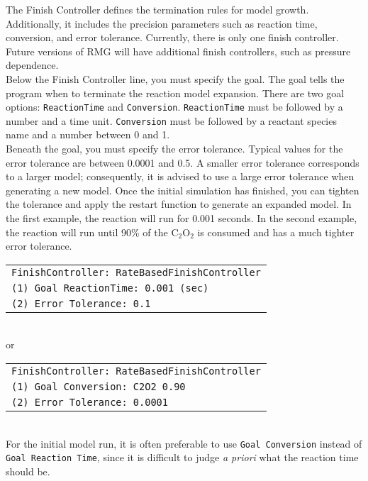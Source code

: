\documentclass[12pt,letterpaper]{article}
\begin{document}
The Finish Controller defines the termination rules for model growth. Additionally,
it includes the precision parameters such as reaction time, conversion,
and error tolerance. Currently, there is only one finish controller. Future
versions of RMG will have additional finish controllers, such as pressure dependence.\\

Below the Finish Controller line, you must specify the goal. The goal tells
the program when to terminate the reaction model expansion. There are two
goal options: \texttt{ReactionTime} and \texttt{Conversion}. \texttt{ReactionTime} must be followed
by a number and a time unit. \texttt{Conversion} must be followed by a reactant
species name and a number between 0 and 1. \\

Beneath the goal, you must specify the error tolerance. Typical values
for the error tolerance are between 0.0001 and 0.5. A smaller error tolerance
corresponds to a larger model; consequently, it is advised to use a large
error tolerance when generating a new model. Once the initial simulation
has finished, you can tighten the tolerance and apply the restart function to
generate an expanded model.
In the first example, the reaction will run for 0.001 seconds. In the second
example, the reaction will run until 90\% of the C$_2$O$_2$ is consumed and has a
much tighter error tolerance. \\

\begin{tabular}{l}
\texttt{FinishController: RateBasedFinishController} \\
\texttt{(1) Goal ReactionTime: 0.001 (sec)} \\
\texttt{(2) Error Tolerance: 0.1} \\
\end{tabular}\\

or\\

\begin{tabular}{l}
\texttt{FinishController: RateBasedFinishController} \\
\texttt{(1) Goal Conversion: C2O2 0.90} \\
\texttt{(2) Error Tolerance: 0.0001} \\
\end{tabular}\\

For the initial model run, it is often preferable to use \texttt{Goal Conversion}
instead of \texttt{Goal Reaction Time}, since it is difficult to judge \textit{a priori} what the
reaction time should be.\\
\end{document}
